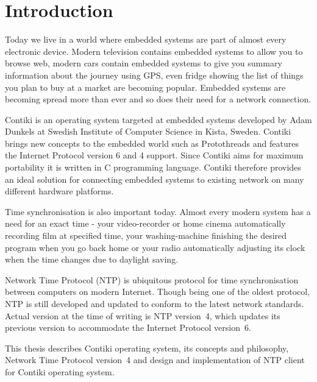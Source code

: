 
\chapter{Introduction}
Today we live in a world where embedded systems are part of almost every electronic device.
Modern television contains embedded systems to allow you to browse web,
modern cars contain embedded systems to give you summary information
about the journey using GPS, even fridge showing the list of things you plan to buy at a market are becoming popular.
Embedded systems are becoming spread more than ever and so does
their need for a network connection.

Contiki is an operating system targeted at embedded systems
developed by Adam Dunkels at Swedish Institute of Computer Science in Kista, Sweden.
Contiki brings new concepts to the embedded world such as Protothreads and features
the Internet Protocol version 6 and 4 support.
Since Contiki aims for maximum portability it is written in C programming language.
Contiki therefore provides an ideal solution for connecting
embedded systems to existing network on many different hardware platforms.

Time synchronisation is also important today.
Almost every modern system has a need for an exact time -
your video-recorder or home cinema automatically recording film at specified time, your washing-machine finishing the
desired program when you go back home or your radio automatically adjusting its clock when the time changes
due to daylight saving.

Network Time Protocol (NTP) is ubiquitous protocol for time synchronisation between computers on modern Internet.
Though being one of the oldest protocol, NTP is still developed and updated to conform to the latest
network standards. Actual version at the time of writing is NTP version~4, which updates its previous version to
accommodate the Internet Protocol version~6.

This thesis describes Contiki operating system, its concepts and philosophy,
Network Time Protocol version~4 and design and implementation of NTP client for Contiki operating system.










